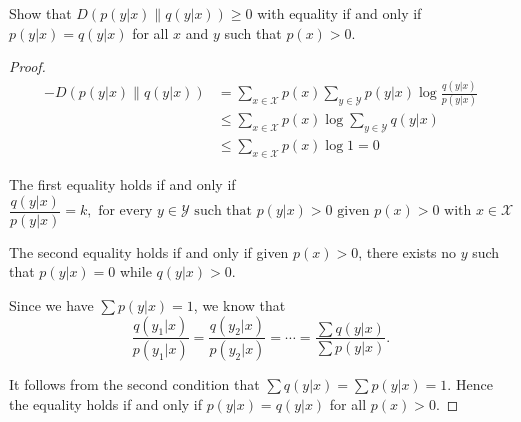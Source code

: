 \begin{exercise} {Show that $D(p(y|x)\| q(y|x))\ge 0$ with equality if and only if $p(y|x)=q(y|x)$ for all $x$ and $y$ such that $p(x)>0$.}
\begin{proof}
  \begin{equation}
    \begin{aligned}
      -D(p(y|x)\| q(y|x)) &= \sum_{x\in \mathcal{X}} p(x) \sum_{y\in \mathcal{Y}}p(y|x)\log \frac{q(y|x)}{p(y|x)} \\
      &\le \sum_{x\in \mathcal{X}} p(x) \log \sum_{y\in \mathcal{Y}} q(y|x) \\
      &\le \sum_{x\in \mathcal{X}} p(x) \log 1 = 0
    \end{aligned}
  \end{equation}

  The first equality holds if and only if $$\frac{q(y|x)}{p(y|x)}=k, \text{ for every } y \in \mathcal{Y} \text{ such that } p(y|x)>0 \text{ given } p(x)>0 \text{ with } x \in \mathcal{X} $$

  The second equality holds if and only if given $p(x)>0$, there exists no $y$ such that $p(y|x)=0$ while $q(y|x)>0$.

  Since we have $\sum p(y|x) = 1$, we know that $$\frac{q(y_1|x)}{p(y_1|x)} = \frac{q(y_2|x)}{p(y_2|x)} = \cdots = \frac{\sum{q(y|x)}}{\sum p(y|x)}. $$

  It follows from the second condition that $\sum q(y|x) = \sum p(y|x) = 1$. Hence the equality holds if and only if $p(y|x) = q(y|x)$ for all $p(x)>0$.

\end{proof}
\end{exercise}


